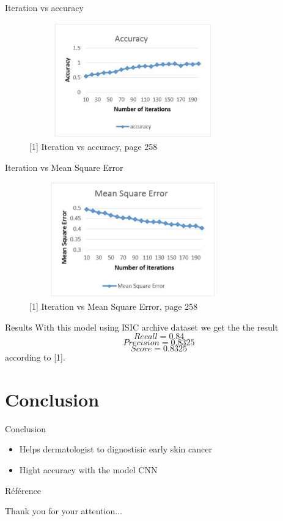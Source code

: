 \documentclass{beamer}
\begin{document}
\begin{frame}{Iteration vs accuracy}
\begin{figure}[H]
    \includegraphics[width=9cm,height=5cm]{images/discuss_3.png}
    \caption{[1] Iteration vs accuracy, page 258}
    \label{fig:L1}
\end{figure} 
\end{frame}

\begin{frame}{Iteration vs Mean Square Error}
\begin{figure}[H]
    \includegraphics[width=9cm,height=5cm]{images/discuss_4.png}
    \caption{[1] Iteration vs Mean Square Error, page 258}
    \label{fig:L1}
\end{figure} 
\end{frame}

\begin{frame}{Results}
With this model using ISIC archive dataset we get the the result 
$$Recall = 0.84$$
$$Precision = 0.8325$$
$$Score = 0.8325$$
according to [1].
\end{frame}


\section{Conclusion}
\begin{frame}{Conclusion}
\begin{itemize}
		\item Helps dermatologist to dignostisic early skin cancer 
		\item Hight accuracy with the model CNN
\end{itemize}
\end{frame}

\begin{frame}{Référence}
\renewcommand*{\bibfont}{\footnotesize}
\nocite{bibskin}
\printbibliography
\end{frame}

\begin{frame}
  \begin{block}{}
  \centering
  Thank you for your attention...
  \end{block}
\end{frame}
\end{document}
